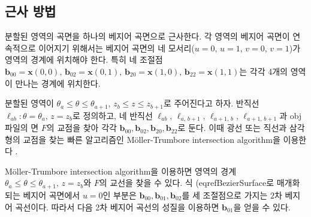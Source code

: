 \documentclass{Humantech_Paper_Awardfullpaper_hutech}
\begin{document}
\subsection{근사 방법}
분할된 영역의 곡면을 하나의 베지어 곡면으로 근사한다. 각 영역의 베지어 곡면이 연속적으로 이어지기 위해서는 베지어 곡면의 네 모서리($u=0, \, u=1, \, v=0, \, v=1$)가 영역의 경계에 위치해야 한다. 특히 네 조절점 $\mathbf{b}_{00} = \mathbf{x}(0, 0), \, \mathbf{b}_{02} = \mathbf{x}(0, 1), \, \mathbf{b}_{20} = \mathbf{x}(1, 0), \, \mathbf{b}_{22} = \mathbf{x}(1, 1)$는 각각 4개의 영역이 만나는 경계에 위치한다. 

분할된 영역이 $\theta_a \leq \theta \leq \theta_{a+1}, \, z_b \leq z \leq z_{b+1}$로 주어진다고 하자. 반직선 $\ell_{ab} \colon \theta = \theta_a, \, z = z_b$로 정의하고, 네 반직선 $\ell_{ab}, \, \ell_{a, \, b+1}, \, \ell_{a+1, \, b}, \, \ell_{a+1, \, b+1}$과 obj파일의 면 $F$의 교점을 찾아 각각 $\mathbf{b}_{00}, \mathbf{b}_{02}, \mathbf{b}_{20}, \mathbf{b}_{22}$로 둔다. 이때 광선 또는 직선과 삼각형의 교점을 찾는 빠른 알고리즘인 Möller-Trumbore intersection algorithm을 이용한다 \cite{raytriangle}.

Möller-Trumbore intersection algorithm을 이용하면 영역의 경계 $\theta_a \leq \theta \leq \theta_{a+1}, \, z = z_b$와 $F$의 교선을 찾을 수 있다. 식 (eqref{BezierSurface}로 매개화되는 베지어 곡면에서 $u = 0$인 부분은 $\mathbf{b}_{00}, \mathbf{b}_{01}, \mathbf{b}_{02}$를 세 조절점으로 가지는 $2$차 베지어 곡선이다. 따라서 다음 2차 베지어 곡선의 성질을 이용하면 $\mathbf{b}_{01}$을 얻을 수 있다. 
\end{document}
